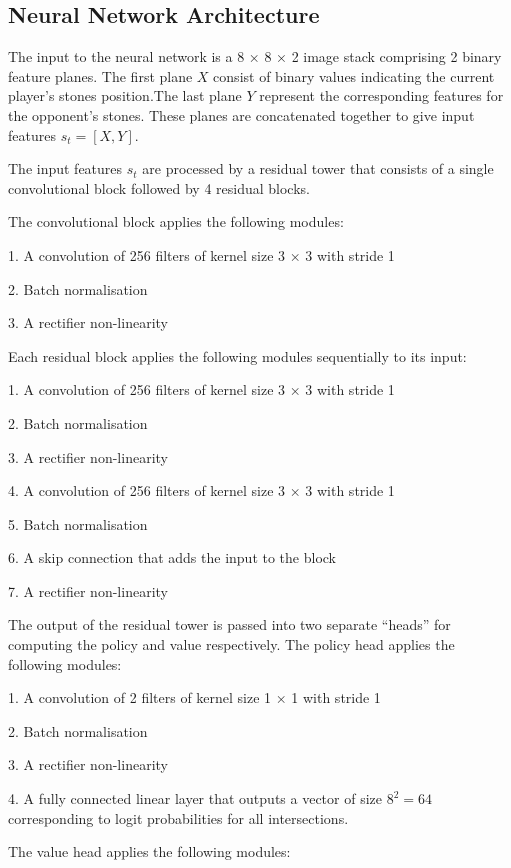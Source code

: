 \documentclass[12pt,a4paper]{article}
\begin{document}
\subsection{Neural Network Architecture}
\hspace{0.6cm}The input to the neural network is a 8 × 8 × 2 image stack comprising 2 binary feature planes. The first plane \(X\) consist of binary values indicating the current player's stones position.The last plane \(Y\) represent the corresponding features for the opponent’s stones. These planes are concatenated together to give input features \(s_t = [X, Y]\).\par
The input features \(s_t\) are processed by a residual tower that consists of a single convolutional block followed by 4 residual blocks\cite{ResNet}.\par
The convolutional block applies the following modules:\par
1. A convolution of 256 filters of kernel size 3 × 3 with stride 1\par
2. Batch normalisation\cite{BN}\par
3. A rectifier non-linearity\par
Each residual block applies the following modules sequentially to its input:\par
1. A convolution of 256 filters of kernel size 3 × 3 with stride 1\par
2. Batch normalisation\par
3. A rectifier non-linearity\par
4. A convolution of 256 filters of kernel size 3 × 3 with stride 1\par
5. Batch normalisation\par
6. A skip connection that adds the input to the block\par
7. A rectifier non-linearity\par
The output of the residual tower is passed into two separate “heads” for computing the policy and value respectively. The policy head applies the following modules:\par
1. A convolution of 2 filters of kernel size 1 × 1 with stride 1\par
2. Batch normalisation\par
3. A rectifier non-linearity\par
4. A fully connected linear layer that outputs a vector of size \(8^2 = 64\) corresponding to logit probabilities for all intersections.\par
The value head applies the following modules:\par
\end{document}
